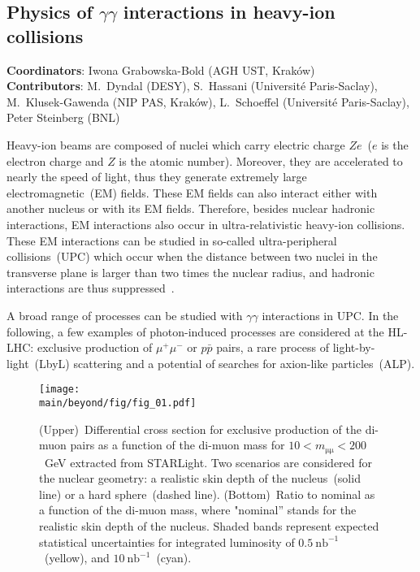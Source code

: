 \subsection{Physics of $\gamma \gamma$ interactions in heavy-ion collisions}
\label{sec:upc}

{ \small
\noindent \textbf{Coordinators}: Iwona Grabowska-Bold (AGH UST, Krak\'ow)\\

\noindent \textbf{Contributors}: 
M.~Dyndal (DESY), 
S.~Hassani (Universit\'e Paris-Saclay), 
M.~Klusek-Gawenda (NIP PAS, Krak\'ow), 
L.~Schoeffel (Universit\'e Paris-Saclay), Peter Steinberg (BNL)
}

Heavy-ion beams are composed of nuclei which carry electric charge $Ze$~($e$ is the electron charge and $Z$ is the atomic number). Moreover, they are accelerated to nearly the speed of light, thus they generate extremely large electromagnetic~(EM) fields. These EM fields can also interact either with another nucleus or with its EM fields.
Therefore, besides nuclear hadronic interactions, EM
interactions also occur in ultra-relativistic heavy-ion collisions.
These EM interactions can be studied in so-called ultra-peripheral
collisions~(UPC) which occur when the distance between two nuclei in the transverse plane is larger than two times the nuclear radius, and hadronic interactions are thus suppressed~\cite{Bertulani:2005ru}.

A broad range of processes can be studied with $\gamma\gamma$ interactions in UPC. In the following, a few examples of photon-induced processes are considered at the HL-LHC: exclusive production of $\mu^+\mu^-$ or $p\bar{p}$ pairs, a rare process of light-by-light~(LbyL) scattering and a potential of searches for axion-like particles~(ALP).

\begin{figure}[!hbt]
\centering
\texttt{[image: \\main/beyond/fig/fig\_01.pdf]}
\caption{
(Upper)~Differential cross section for exclusive production of the di-muon pairs as a function of the di-muon mass for
$10<m_{\mathrm{\mu\mu}}<200$~GeV extracted from STARLight. Two
scenarios are considered for the nuclear geometry: a realistic skin
depth of the nucleus~(solid line) or a hard sphere~(dashed
line). (Bottom)~Ratio to nominal as a function of the di-muon mass,
where "nominal'' stands for the realistic skin depth of the nucleus.
 Shaded bands represent expected statistical uncertainties for integrated luminosity of $0.5~\mathrm{nb}^{-1}$~(yellow), and $10~\mathrm{nb}^{-1}$~(cyan).}
\label{fig:mumu}
\end{figure}

